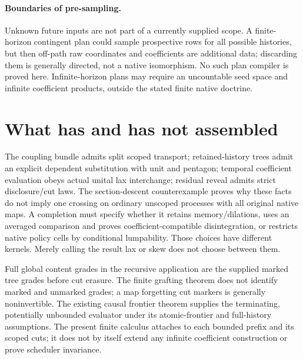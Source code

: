 \documentclass[11pt]{article}
\begin{document}
\paragraph{Boundaries of pre-sampling.} Unknown future inputs are not part of a currently supplied scope. A finite-horizon contingent plan could sample prospective rows for all possible histories, but then off-path raw coordinates and coefficients are additional data; discarding them is generally directed, not a native isomorphism. No such plan compiler is proved here. Infinite-horizon plans may require an uncountable seed space and infinite coefficient products, outside the stated finite native doctrine.

\section{What has and has not assembled}
The coupling bundle admits split scoped transport; retained-history trees admit an explicit dependent substitution with unit and pentagon; temporal coefficient evaluation obeys actual unital lax interchange; residual reveal admits strict disclosure/cut laws. The section-descent counterexample proves why these facts do not imply one crossing on ordinary unscoped processes with all original native maps. A completion must specify whether it retains memory/dilations, uses an averaged comparison and proves coefficient-compatible disintegration, or restricts native policy cells by conditional lumpability. Those choices have different kernels. Merely calling the result lax or skew does not choose between them.

Full global content grades in the recursive application are the supplied marked tree grades before cut erasure. The finite grafting theorem does not identify marked and unmarked grades; a map forgetting cut markers is generally noninvertible. The existing causal frontier theorem supplies the terminating, potentially unbounded evaluator under its atomic-frontier and full-history assumptions. The present finite calculus attaches to each bounded prefix and its scoped cuts; it does not by itself extend any infinite coefficient construction or prove scheduler invariance.
\end{document}

